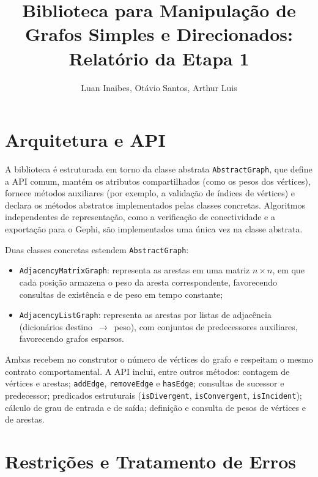 \documentclass[12pt]{article}
\title{Biblioteca para Manipulação de Grafos Simples e Direcionados:\\Relatório da Etapa 1}
\author{Luan  Inaibes\inst{1}, Otávio Santos\inst{1}, Arthur Luis\inst{1}}
\begin{document}
\maketitle

\begin{abstract}

\end{abstract}

\begin{resumo}

\end{resumo}

\section{Arquitetura e API}

A biblioteca é estruturada em torno da classe abstrata
\texttt{AbstractGraph}, que define a API comum, mantém os atributos
compartilhados (como os pesos dos vértices), fornece métodos auxiliares
(por exemplo, a validação de índices de vértices) e declara os métodos
abstratos implementados pelas classes concretas. Algoritmos
independentes de representação, como a verificação de conectividade e a
exportação para o Gephi, são implementados uma única vez na classe
abstrata.

Duas classes concretas estendem \texttt{AbstractGraph}:

\begin{itemize}
  \item \texttt{AdjacencyMatrixGraph}: representa as arestas em uma matriz
  $n \times n$, em que cada posição armazena o peso da aresta
  correspondente, favorecendo consultas de existência e de peso em tempo
  constante;
  \item \texttt{AdjacencyListGraph}: representa as arestas por listas de
  adjacência (dicionários destino~$\rightarrow$~peso), com conjuntos de
  predecessores auxiliares, favorecendo grafos esparsos.
\end{itemize}

Ambas recebem no construtor o número de vértices do grafo e respeitam o
mesmo contrato comportamental. A API inclui, entre outros métodos:
contagem de vértices e arestas; \texttt{addEdge}, \texttt{removeEdge} e
\texttt{hasEdge}; consultas de sucessor e predecessor; predicados
estruturais (\texttt{isDivergent}, \texttt{isConvergent},
\texttt{isIncident}); cálculo de grau de entrada e de saída; definição e
consulta de pesos de vértices e de arestas.

\section{Restrições e Tratamento de Erros}
\end{document}
